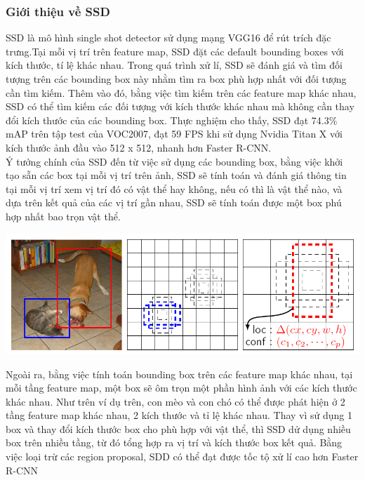 \documentclass[a4paper,10pt]{article}
\begin{document}
 \subsubsection{Giới thiệu về SSD}
SSD là mô hình single shot detector sử dụng mạng VGG16 để rút trích đặc trưng.Tại mỗi vị trí trên feature map, SSD đặt các default bounding boxes với kích thước, tí lệ khác nhau. Trong quá trình xử lí, SSD sẽ đánh giá và tìm đối tượng trên các bounding box này nhằm tìm ra box phù hợp nhất với đối tượng cần tìm kiếm. Thêm vào đó, bằng việc tìm kiếm trên các feature map khác nhau, SSD có thể tìm kiếm các đối tượng với kích thước khác nhau mà không cần thay đổi kích thước của các bounding box. Thực nghiệm cho thấy, SSD đạt 74.3\% mAP trên tập test của VOC2007, đạt 59 FPS khi sử dụng Nvidia Titan X với kích thước ảnh đầu vào 512 x 512, nhanh hơn Faster R-CNN.
\\Ý tưởng chính của SSD đến từ việc sử dụng các bounding box, bằng việc khởi tạo sẵn các box tại mỗi vị trí trên ảnh, SSD sẽ tính toán và đánh giá thông tin tại mỗi vị trí xem vị trí đó có vật thể hay không, nếu có thì là vật thể nào, và dựa trên kết quả của các vị trí gần nhau, SSD sẽ tính toán được một box phú hợp nhất bao trọn vật thể.
\begin{center}
\includegraphics[scale=.5]{image/SSD1}
\end{center}
Ngoài ra, bằng việc tính toán bounding box trên các feature map khác nhau, tại mỗi tầng feature map, một box sẽ ôm trọn một phần hình ảnh với các kích thước khác nhau. Như trên ví dụ trên, con mèo và con chó có thể được phát hiện ở 2 tầng feature map khác nhau, 2 kích thước và tỉ lệ khác nhau. Thay vì sử dụng 1 box và thay đổi kích thước box cho phù hợp với vật thể, thì SSD dử dụng nhiều box trên nhiều tầng, từ đó tổng hợp ra vị trí và kích thước box kết quả. Bằng việc loại trừ các region proposal, SDD có thể đạt được tốc tộ xử lí cao hơn Faster R-CNN
\end{document}
